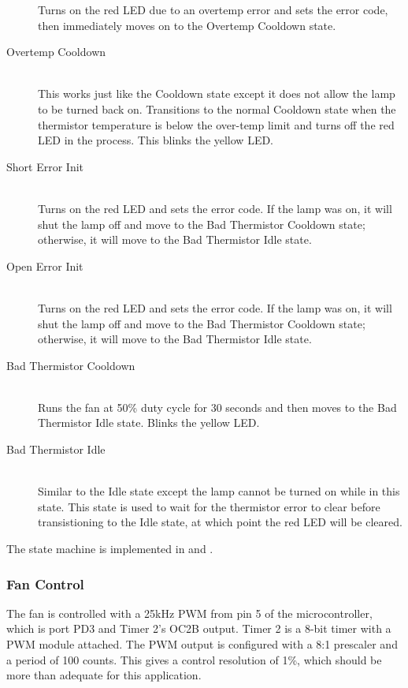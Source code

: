 \documentclass{article}
\begin{document}
\begin{description}
    Turns on the red LED due to an overtemp error and sets the error code, then immediately moves on
    to the Overtemp Cooldown state.
  \item[Overtemp Cooldown] \hfill \\
    This works just like the Cooldown state except it does not allow the lamp to be turned back on.
    Transitions to the normal Cooldown state when the thermistor temperature is below the over-temp
    limit and turns off the red LED in the process.  This blinks the yellow LED.
  \item[Short Error Init] \hfill \\
    Turns on the red LED and sets the error code.  If the lamp was on, it will shut the lamp off and
    move to the Bad Thermistor Cooldown state; otherwise, it will move to the Bad Thermistor Idle
    state.
  \item[Open Error Init] \hfill \\
    Turns on the red LED and sets the error code.  If the lamp was on, it will shut the lamp off and
    move to the Bad Thermistor Cooldown state; otherwise, it will move to the Bad Thermistor Idle
    state.
  \item[Bad Thermistor Cooldown] \hfill \\
    Runs the fan at 50\% duty cycle for 30 seconds and then moves to the Bad Thermistor Idle state.
    Blinks the yellow LED.
  \item[Bad Thermistor Idle] \hfill \\
    Similar to the Idle state except the lamp cannot be turned on while in this state.  This state
    is used to wait for the thermistor error to clear before transistioning to the Idle state, at
    which point the red LED will be cleared.
\end{description}

The state machine is implemented in  and .

\subsubsection{Fan Control} \label{sssec:FWAppFanControl}
The fan is controlled with a 25kHz PWM from pin 5 of the microcontroller, which is port PD3 and Timer
2's OC2B output.  Timer 2 is a 8-bit timer with a PWM module attached.  The PWM output is configured
with a 8:1 prescaler and a period of 100 counts.  This gives a control resolution of 1\%, which
should be more than adequate for this application.
\end{document}
